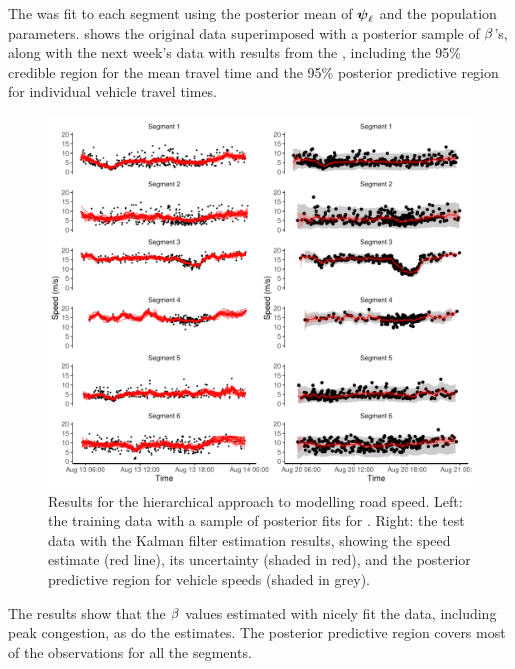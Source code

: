 The \kf{} was fit to each segment using the posterior mean of $\mathbf{\boldsymbol{\psi}}_\ell$ and the population parameters.  shows the original data superimposed with a posterior sample of $\beta$'s, along with the next week's data with results from the \kf{}, including the 95\% credible region for the mean travel time and the 95\% posterior predictive region for individual vehicle travel times.







\begin{knitrout}\small
{}\color{fgcolor}\begin{figure}
\includegraphics[width=\textwidth]{figure/nw_model_n2_kf-1} \caption[Results for the hierarchical approach to modelling road speed]{Results for the hierarchical approach to modelling road speed. Left: the training data with a sample of posterior fits for . Right: the test data with the Kalman filter estimation results, showing the speed estimate (red line), its uncertainty (shaded in red), and the posterior predictive region for vehicle speeds (shaded in grey).}\label{fig:nw_model_n2_kf}
\end{figure}


\end{knitrout}

The results show that the $\beta$ values estimated with  nicely fit the data, including peak congestion, as do the \kf{} estimates. The posterior predictive region covers most of the observations for all the segments.
